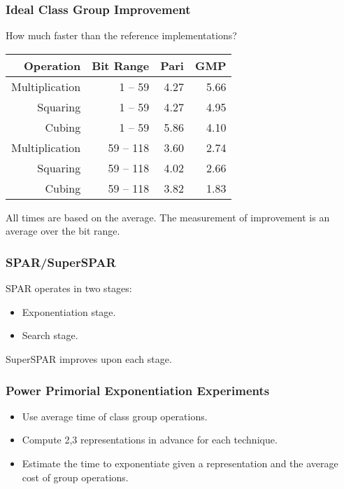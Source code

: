 \documentclass{beamer}
\newcommand{\smallfont}{\fontsize{6pt}{7.2}\selectfont}
\begin{document}
\begin{frame}
\frametitle{Ideal Class Group Improvement}
How much faster than the reference implementations?
\begin{table}
\centering
\begin{tabular}{ | r | r | r | r | }
\hline
Operation & Bit Range & Pari & GMP \\
\hline
Multiplication & 1 -- 59 & 4.27 & 5.66 \\
Squaring & 1 -- 59 & 4.27 & 4.95 \\
Cubing & 1 -- 59 & 5.86 & 4.10 \\
Multiplication & 59 -- 118 & 3.60 & 2.74 \\
Squaring & 59 -- 118 & 4.02 & 2.66 \\
Cubing & 59 -- 118 & 3.82 & 1.83 \\
\hline
\end{tabular}
\end{table}

\bigskip
\smallfont
All times are based on the average.  The measurement of improvement is an average over the bit range.
\end{frame}





\begin{frame}
\frametitle{SPAR/SuperSPAR}
SPAR operates in two stages:
\begin{itemize}
\item Exponentiation stage.
\item Search stage.
\end{itemize}

\bigbreak
SuperSPAR improves upon each stage.
\end{frame}

\begin{frame}
\frametitle{Power Primorial Exponentiation Experiments}
\begin{itemize}
\item Use average time of class group operations.
\item Compute 2,3 representations in advance for each technique.
\item Estimate the time to exponentiate given a representation and the average cost of group operations.
\end{itemize}
\end{frame}
\end{document}
